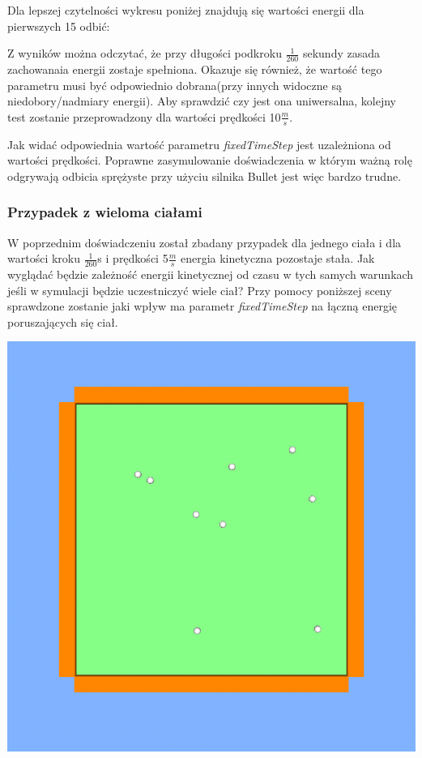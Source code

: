 

Dla lepszej czytelności wykresu poniżej znajdują się wartości energii dla
pierwszych 15 odbić:



Z wyników można odczytać, że przy długości podkroku $ \frac{1}{260} $ sekundy
zasada zachowanaia energii zostaje spełniona. Okazuje się również, że wartość
tego parametru musi być odpowiednio dobrana(przy innych widoczne są
niedobory/nadmiary energii). Aby sprawdzić czy jest ona uniwersalna, kolejny
test zostanie przeprowadzony dla wartości prędkości 10$\frac{m}{s}$.



Jak widać odpowiednia wartość parametru \emph{fixedTimeStep} jest uzależniona od
wartości prędkości. Poprawne zasymulowanie doświadczenia w którym ważną rolę
odgrywają odbicia sprężyste przy użyciu silnika Bullet jest więc bardzo trudne.

\subsubsection{Przypadek z wieloma ciałami}

W poprzednim doświadczeniu został zbadany przypadek dla jednego ciała i dla
wartości kroku $ \frac{1}{260} $s i prędkości 5$ \frac{m}{s} $ energia
kinetyczna pozostaje stała. Jak wyglądać będzie zależność energii kinetycznej od
czasu w tych samych warunkach jeśli w symulacji będzie uczestniczyć wiele ciał?
Przy pomocy poniższej sceny sprawdzone zostanie jaki wpływ ma parametr
\emph{fixedTimeStep} na łączną energię poruszających się ciał.

\includegraphics[width=\textwidth]{./img/shot_2.png}

